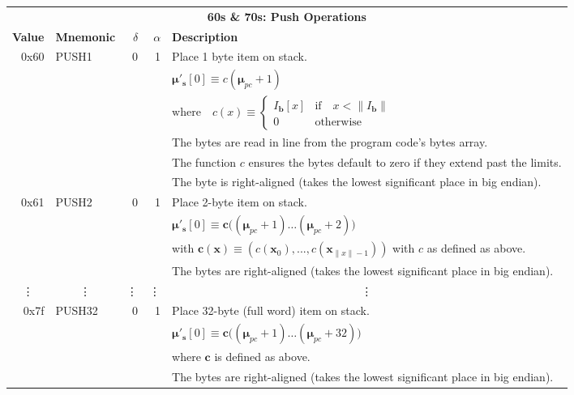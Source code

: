 \documentclass[9pt,oneside]{amsart}
\begin{document}
\begin{tabular*}{\columnwidth}[h]{rlrrl}
\toprule
\multicolumn{5}{c}{\textbf{60s \& 70s: Push Operations}} \vspace{5pt} \\
\textbf{Value} & \textbf{Mnemonic} & $\delta$ & $\alpha$ & \textbf{Description} \vspace{5pt} \\
0x60 & {\small PUSH1} & 0 & 1 & Place 1 byte item on stack. \\
&&&& $\boldsymbol{\mu}'_\mathbf{s}[0] \equiv c(\boldsymbol{\mu}_{pc} + 1)$ \\
&&&& $\text{where} \quad c(x) \equiv \begin{cases} I_\mathbf{b}[x] & \text{if} \quad x < \lVert I_\mathbf{b} \rVert \\ 0 & \text{otherwise} \end{cases}$ \\
&&&& The bytes are read in line from the program code's bytes array. \\
&&&& The function $c$ ensures the bytes default to zero if they extend past the limits.\\
&&&& The byte is right-aligned (takes the lowest significant place in big endian). \\
\midrule
0x61 & {\small PUSH2} & 0 & 1 & Place 2-byte item on stack. \\
&&&& $\boldsymbol{\mu}'_\mathbf{s}[0] \equiv \boldsymbol{c}\big( (\boldsymbol{\mu}_{pc} + 1) \dots (\boldsymbol{\mu}_{pc} + 2) \big)$ \\
&&&& with $\boldsymbol{c}(\boldsymbol{x}) \equiv (c(\boldsymbol{x}_0), ..., c(\boldsymbol{x}_{\lVert x \rVert -1})) $ with $c$ as defined as above. \\
&&&& The bytes are right-aligned (takes the lowest significant place in big endian). \\
\midrule
\multicolumn{1}{c}{\vdots} & \multicolumn{1}{c}{\vdots} & \vdots & \vdots & \multicolumn{1}{c}{\vdots} \\
\midrule
0x7f & {\small PUSH32} & 0 & 1 & Place 32-byte (full word) item on stack. \\
&&&& $\boldsymbol{\mu}'_\mathbf{s}[0] \equiv \boldsymbol{c}\big((\boldsymbol{\mu}_{pc} + 1) \dots (\boldsymbol{\mu}_{pc} + 32) \big)$ \\
&&&& where $\boldsymbol{c}$ is defined as above. \\
&&&& The bytes are right-aligned (takes the lowest significant place in big endian). \\
\bottomrule
\end{tabular*}
\end{document}
